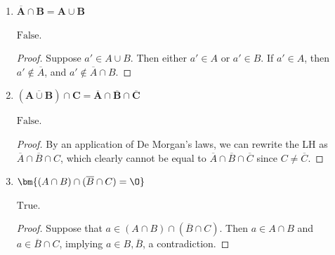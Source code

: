 \documentclass[10pt, oneside]{article}
\begin{document}
\begin{enumerate}[label=1.\arabic*]
\begin{enumerate}
	$\boxed{\text{True}}$.
	
	\begin{proof}
	\textbf{LH} Let $a \in A \cup B$. Then either $a \in A$ or $B$, or both. Suppose $a \notin B$, then we must have $a \in A, \overline{B}$, and consequently inclusion in the RH. Otherwise, $a \notin A$ implies $a \in B$, establishing RH inclusion.
	
	\textbf{RH} Let $a' \in (A \cap \overline{B}) \cup B = (A \cup B) \cap (B \cup \overline{B}) = A \cup B$.
	\end{proof}
	
	\item  \begin{tcolorbox}[
	  colback=Cerulean!5!white,
	  colframe=Cerulean!75!black]
	\textbf{$\bm{\overline{A} \cap B = A \cup B}$}
	\end{tcolorbox}
	
	$\boxed{\text{False}}$.
	
	\begin{proof}
	Suppose $a' \in A \cup B$. Then either $a' \in A$ or $a' \in B$. If $a' \in A$, then $a' \notin \overline{A}$, and $a' \notin \overline{A} \cap B$.
	\end{proof}
	
	\item  \begin{tcolorbox}[
	  colback=Cerulean!5!white,
	  colframe=Cerulean!75!black]
	\textbf{$\bm{(\overline{A \cup B}) \cap C = \overline{A} \cap \overline{B} \cap \overline{C}}$}
	\end{tcolorbox}
	
	$\boxed{\text{False}}$.
	
	\begin{proof}
	By an application of De Morgan's laws, we can rewrite the LH as $\overline{A} \cap \overline{B} \cap C$, which clearly cannot be equal to $\overline{A} \cap \overline{B} \cap \overline{C}$ since $C \neq \overline{C}$.
	\end{proof}
	
	\item  \begin{tcolorbox}[
	  colback=Cerulean!5!white,
	  colframe=Cerulean!75!black]
	\textbf{$\bm{(A \cap B) \cap (\overline{B} \cap C) = \O}$}
	\end{tcolorbox}
	
	$\boxed{\text{True}}$.
	
	\begin{proof}
	Suppose that $a \in (A \cap B) \cap (\overline{B} \cap C)$. Then $a \in A \cap B$ and $a \in \overline{B} \cap C$, implying $a \in B, \overline{B}$, a contradiction.
	\end{proof}
	

\end{enumerate}
\end{enumerate}
\end{document}
